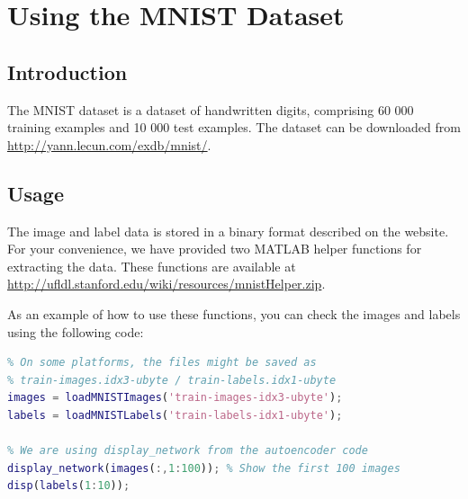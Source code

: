 %


\section{Using the MNIST Dataset} \label{chp:usemnistdata}

\subsection{Introduction}
The MNIST dataset is a dataset of handwritten digits, comprising 60 000 training examples and 10 000 test examples. The dataset can be downloaded from \url{http://yann.lecun.com/exdb/mnist/}.

\subsection{Usage}

The image and label data is stored in a binary format described on the website. For your convenience, we have provided two MATLAB helper functions for extracting the data. These functions are available at \url{http://ufldl.stanford.edu/wiki/resources/mnistHelper.zip}.

As an example of how to use these functions, you can check the images and labels using the following code:
\begin{lstlisting}[language=matlab]
% Change the filenames if you've saved the files under different names
% On some platforms, the files might be saved as
% train-images.idx3-ubyte / train-labels.idx1-ubyte
images = loadMNISTImages('train-images-idx3-ubyte');
labels = loadMNISTLabels('train-labels-idx1-ubyte');

% We are using display_network from the autoencoder code
display_network(images(:,1:100)); % Show the first 100 images
disp(labels(1:10));
\end{lstlisting}






\section{}

